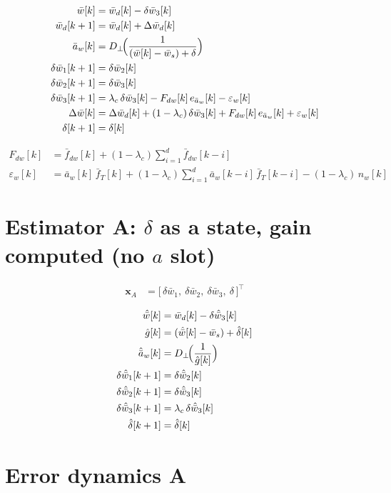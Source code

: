 \documentclass[11pt,a4paper,fontset=none]{ctexart}
\newcommand{\ba}{\bar{a}}
\newcommand{\bw}{\bar{w}}
\newcommand{\dW}{\Delta\bw}
\newcommand{\ah}{\hat{\ba}_w}
\newcommand{\wh}{\hat{\bw}}
\newcommand{\Dp}{D_{\perp}}
\newcommand{\dl}{\delta}
\newcommand{\dlh}{\hat{\delta}}
\newcommand{\gh}{\hat{g}}
\begin{document}
\begin{align*}
\bw[k]           &= \bw_d[k] - \delta\bw_3[k] \\
\bw_d[k+1]       &= \bw_d[k] + \Delta\bw_d[k] \\
\ba_w[k]         &= \Dp\!\Bigl(\frac{1}{(\bw[k] - \bw_s) + \dl}\Bigr) \\
\delta\bw_1[k+1] &= \delta\bw_2[k] \\
\delta\bw_2[k+1] &= \delta\bw_3[k] \\
\delta\bw_3[k+1] &= \lambda_c\,\delta\bw_3[k] - F_{dw}[k]\,e_{\ba_w}[k] - \varepsilon_w[k] \\
\dW[k]           &= \Delta\bw_d[k] + (1-\lambda_c)\,\delta\bw_3[k] + F_{dw}[k]\,e_{\ba_w}[k] + \varepsilon_w[k] \\
\dl[k+1]         &= \dl[k]
\end{align*}

\begin{align*}
F_{dw}[k]        &= \bar f_{dw}[k] + (1-\lambda_c)\sum_{i=1}^{d}\bar f_{dw}[k-i] \\
\varepsilon_w[k] &= \ba_w[k]\,\bar f_T[k] + (1-\lambda_c)\sum_{i=1}^{d}\ba_w[k-i]\,\bar f_T[k-i] - (1-\lambda_c)\,n_w[k]
\end{align*}

\section{Estimator A: $\dl$ as a state, gain computed (no $a$ slot)}

\begin{align*}
\mathbf{x}_A &= \bigl[\,\delta\bw_1,\ \delta\bw_2,\ \delta\bw_3,\ \dl\,\bigr]^{\top}
\end{align*}

\begin{align*}
\wh[k]                 &= \bw_d[k] - \delta\hat{\bw}_3[k] \\
\gh[k]                 &= (\wh[k] - \bw_s) + \dlh[k] \\
\ah[k]                 &= \Dp\!\Bigl(\frac{1}{\gh[k]}\Bigr) \\
\delta\hat{\bw}_1[k+1] &= \delta\hat{\bw}_2[k] \\
\delta\hat{\bw}_2[k+1] &= \delta\hat{\bw}_3[k] \\
\delta\hat{\bw}_3[k+1] &= \lambda_c\,\delta\hat{\bw}_3[k] \\
\dlh[k+1]              &= \dlh[k]
\end{align*}

\section{Error dynamics A}
\end{document}
